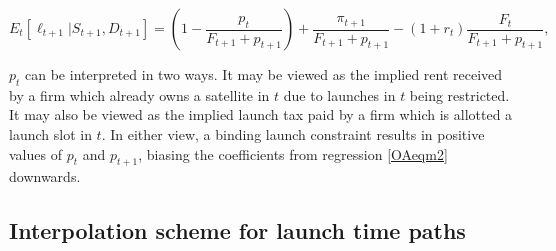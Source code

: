 \documentclass[12pt]{article}
\begin{document}
\begin{equation}
\label{OAfloweqmcond}
E_t[\ell_{t+1}|S_{t+1},D_{t+1}] = (1 - \frac{p_t}{F_{t+1} + p_{t+1}}) + \frac{\pi_{t+1}}{F_{t+1} + p_{t+1}} - (1+r_t)\frac{F_t}{F_{t+1} + p_{t+1}},
\end{equation}

$p_t$ can be interpreted in two ways. It may be viewed as the implied rent received by a firm which already owns a satellite in $t$ due to launches in $t$ being restricted. It may also be viewed as the implied launch tax paid by a firm which is allotted a launch slot in $t$. In either view, a binding launch constraint results in positive values of $p_t$ and $p_{t+1}$, biasing the coefficients from regression \ref{OAeqm2} downwards. %

\subsection{Interpolation scheme for launch time paths}
\label{interpolation}
\end{document}
